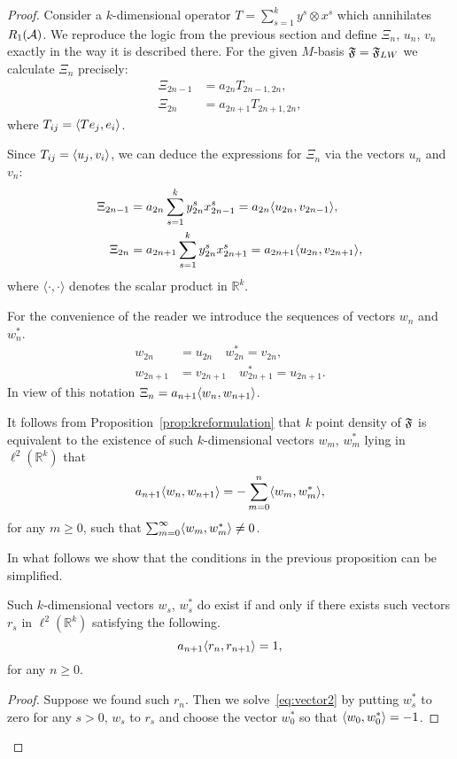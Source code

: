   \begin{proof}
    Consider a $k$-dimensional operator $T = \sum_{s=1}^k y^s \otimes x^s$ which annihilates $R_1(\cal{A})$.
    We reproduce the logic from the previous section and define $\Xi_n$, $u_n$, $v_n$ exactly in the way it is described there.
    For the given $M$-basis $\fsys = \fsys_{LW}$ we calculate $\Xi_n$ precisely:
    \begin{align*}
      \Xi_{2n-1} &= a_{2n}T_{2n - 1, 2n},\\
      \Xi_{2n} &= a_{2n + 1}T_{2n + 1, 2n},
    \end{align*}
      where $T_{ij} = \inner{Te_j}{e_i}$.

    Since $T_{ij} = \inner{u_j}{v_i}$, we can deduce the expressions for $\Xi_n$ via the vectors $u_n$ and $v_n$:
    \begin{align*}
      \Xi_{2n-1} &= a_{2n} \sum_{s=1}^k y^s_{2n} x^s_{2n-1} = a_{2n} \inner{u_{2n}}{v_{2n-1}},\\
      \Xi_{2n} &= a_{2n+1} \sum_{s=1}^k y^s_{2n} x^s_{2n+1} = a_{2n+1} \inner{u_{2n}}{v_{2n+1}},
    \end{align*}
      where $\langle\cdot, \cdot\rangle$ denotes the scalar product in $\mathbb{R}^k$.

    For the convenience of the reader we introduce the sequences of vectors $w_n$ and $w^*_n$.
    \begin{align*}
      w_{2n} &= u_{2n} \quad w^*_{2n} = v_{2n},\\
      w_{2n+1} &= v_{2n+1} \quad w^*_{2n+1} = u_{2n+1}.
    \end{align*}
    In view of this notation $\Xi_n = a_{n+1} \inner{w_n}{w_{n+1}}$.

    It follows from Proposition~\ref{prop:kreformulation} that $k$ point density of $\fsys$ is equivalent to the existence of
      such $k$-dimensional vectors $w_m$, $w^*_m$ lying in $\ell^2(\mathbb{R}^k)$ that
    \begin{equation}
      \label{eq:vector2}
      a_{n+1} \inner{w_n}{w_{n+1}} = -\sum_{m=0}^n \inner{w_m}{w^*_m},
    \end{equation}
      for any $m \geq 0$, such that $\sum_{m=0}^\infty \inner{w_m}{w^*_m} \neq 0$.

    In what follows we show that the conditions in the previous proposition can be simplified.
    \begin{prop}
      \label{prop:reformulation-lw}
      Such $k$-dimensional vectors $w_s$, $w^*_s$ do exist if and only if there exists such vectors $r_s$ in $\ell^2(\mathbb{R}^k)$
        satisfying the following.
      \begin{equation}
        \label{eq:vector3}
        a_{n+1} \inner{r_n}{r_{n+1}} = 1,
      \end{equation}
      for any $n \geq 0$.
    \end{prop}
    \begin{proof}
      Suppose we found such $r_n$.
      Then we solve~\eqref{eq:vector2} by putting $w^*_s$ to zero for any $s > 0$, $w_s$ to $r_s$ and
        choose the vector $w^*_0$ so that $\inner{w_0}{w^*_0} = -1$.


\end{proof}
\end{proof}
